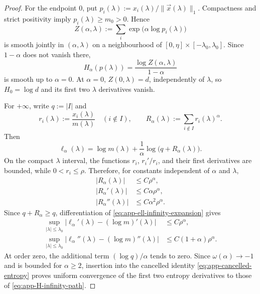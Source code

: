 \documentclass[aps,pra,11pt,onecolumn,nofootinbib,tightenlines]{revtex4-2}
\theoremstyle{definition}
\begin{document}
\begin{proof}
For the endpoint $0$, put $p_i(\lambda):=x_i(\lambda)/\|\vec x(\lambda)\|_1$.  Compactness and strict positivity imply $p_i(\lambda)\geq m_0>0$.  Hence
\begin{equation}
 Z(\alpha,\lambda):=\sum_i
 \exp\bigl(\alpha\log p_i(\lambda)\bigr)
 \label{eq:app-Z-zero-endpoint}
\end{equation}
is smooth jointly in $(\alpha,\lambda)$ on a neighbourhood of
$[0,\eta]\times[-\lambda_0,\lambda_0]$.  Since $1-\alpha$ does not vanish there,
\begin{equation}
 H_\alpha(p(\lambda))=\frac{\log Z(\alpha,\lambda)}{1-\alpha}
 \label{eq:app-H-near-zero}
\end{equation}
is smooth up to $\alpha=0$.  At $\alpha=0$, $Z(0,\lambda)=d$, independently of $\lambda$, so $H_0=\log d$ and its first two $\lambda$ derivatives vanish.

For $+\infty$, write $q:=|I|$ and
\begin{equation}
 r_i(\lambda):=\frac{x_i(\lambda)}{m(\lambda)}
 \quad(i\notin I),
 \qquad
 R_\alpha(\lambda):=\sum_{i\notin I}r_i(\lambda)^\alpha.
 \label{eq:app-R-infinity}
\end{equation}
Then
\begin{equation}
 \ell_\alpha(\lambda)
 =\log m(\lambda)
 +\frac1\alpha\log\bigl(q+R_\alpha(\lambda)\bigr).
 \label{eq:app-ell-infinity-expansion}
\end{equation}
On the compact $\lambda$ interval, the functions $r_i$, $r_i'/r_i$, and their first derivatives are bounded, while $0<r_i\leq\rho$.  Therefore, for constants independent of $\alpha$ and $\lambda$,
\begin{align}
 |R_\alpha(\lambda)|&\leq C\rho^\alpha,
 \label{eq:app-R0-bound}\\
 |R_\alpha'(\lambda)|&\leq C\alpha\rho^\alpha,
 \label{eq:app-R1-bound}\\
 |R_\alpha''(\lambda)|&\leq C\alpha^2\rho^\alpha.
 \label{eq:app-R2-bound}
\end{align}
Since $q+R_\alpha\geq q$, differentiation of \eqref{eq:app-ell-infinity-expansion} gives
\begin{align}
 \sup_{|\lambda|\leq\lambda_0}
 \left|\ell_\alpha'(\lambda)-(\log m)'(\lambda)\right|
 &\leq C\rho^\alpha,
 \label{eq:app-infinity-first-bound}\\
 \sup_{|\lambda|\leq\lambda_0}
 \left|\ell_\alpha''(\lambda)-(\log m)''(\lambda)\right|
 &\leq C(1+\alpha)\rho^\alpha.
 \label{eq:app-infinity-second-bound}
\end{align}
At order zero, the additional term $(\log q)/\alpha$ tends to zero.  Since $\omega(\alpha)\to-1$ and is bounded for $\alpha\geq2$, insertion into the cancelled identity \eqref{eq:app-cancelled-entropy} proves uniform convergence of the first two entropy derivatives to those of \eqref{eq:app-H-infinity-path}.
\end{proof}
\end{document}
